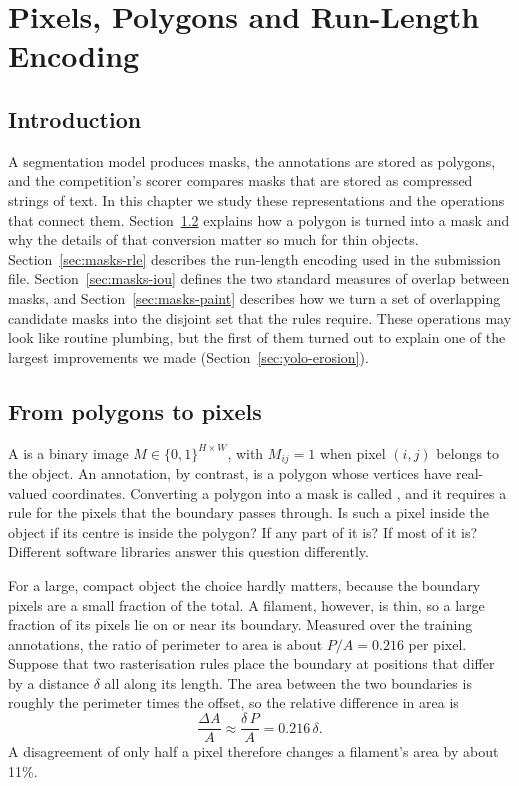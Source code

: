 \chapter{Pixels, Polygons and Run-Length Encoding}\label{ch:masks}

\section{Introduction}\label{sec:masks-intro}
A segmentation model produces masks, the annotations are stored as polygons, and the competition's
scorer compares masks that are stored as compressed strings of text. In this chapter we study
these representations and the operations that connect them. Section~\ref{sec:masks-raster}
explains how a polygon is turned into a mask and why the details of that conversion matter so much
for thin objects. Section~\ref{sec:masks-rle} describes the run-length encoding used in the
submission file. Section~\ref{sec:masks-iou} defines the two standard measures of overlap between
masks, and Section~\ref{sec:masks-paint} describes how we turn a set of overlapping candidate masks
into the disjoint set that the rules require. These operations may look like routine plumbing, but
the first of them turned out to explain one of the largest improvements we made
(Section~\ref{sec:yolo-erosion}).

\section{From polygons to pixels}\label{sec:masks-raster}
A  is a binary image $M\in\{0,1\}^{H\times W}$, with $M_{ij}=1$ when pixel $(i,j)$
belongs to the object. An annotation, by contrast, is a polygon whose vertices have real-valued
coordinates. Converting a polygon into a mask is called , and it requires a
rule for the pixels that the boundary passes through. Is such a pixel inside the object if its
centre is inside the polygon? If any part of it is? If most of it is? Different software libraries
answer this question differently.

For a large, compact object the choice hardly matters, because the boundary pixels are a small
fraction of the total. A filament, however, is thin, so a large fraction of its pixels lie on or
near its boundary. Measured over the training annotations, the ratio of perimeter to area is about
$P/A=0.216$ per pixel. Suppose that two rasterisation rules place the boundary at positions that
differ by a distance $\delta$ all along its length. The area between the two boundaries is roughly
the perimeter times the offset, so the relative difference in area is
\begin{equation}
\frac{\Delta A}{A}\approx\frac{\delta\,P}{A}=0.216\,\delta .
\label{eq:masks-offset}
\end{equation}
A disagreement of only half a pixel therefore changes a filament's area by about 11\%.

